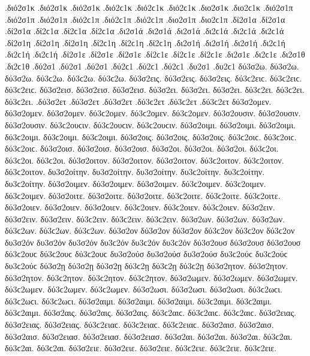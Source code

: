 {.διό2σ1κ .διό2σ1κ .διό2σ1κ .διό2ϲ1κ .διό2ϲ1κ .διό2ϲ1κ   %
.διο2σ1κ .διο2ϲ1κ 
.διό2σ1π .διό2σ1π .διό2σ1π .διό2ϲ1π .διό2ϲ1π .διό2ϲ1π   %
.διο2σ1π .διο2ϲ1π 
.δί2σ1α .δί2σ1α .δί2σ1α .δί2ϲ1α .δί2ϲ1α .δί2ϲ1α   %
.δι2σ1ά .δι2σ1ά .δι2σ1ά .δι2ϲ1ά .δι2ϲ1ά .δι2ϲ1ά 
.δί2σ1η .δί2σ1η .δί2σ1η .δί2ϲ1η .δί2ϲ1η .δί2ϲ1η   %
.δι2σ1ή .δι2σ1ή .δι2σ1ή .δι2ϲ1ή .δι2ϲ1ή .δι2ϲ1ή 
.δί2σ1ε .δί2σ1ε .δί2σ1ε .δί2ϲ1ε .δί2ϲ1ε .δί2ϲ1ε   %
.δι2σ1ε .δι2ϲ1ε 
.δι2σ1θ .δι2ϲ1θ   %
.δύ2σ1 .δύ2σ1 .δύ2σ1 .δύ2ϲ1 .δύ2ϲ1 .δύ2ϲ1   %
.δυ2σ1 .δυ2ϲ1 
%
δύ3σ2ω. δύ3σ2ω. δύ3σ2ω. δύ3ϲ2ω. δύ3ϲ2ω. δύ3ϲ2ω.   %
δύ3σ2εις. δύ3σ2εις. δύ3σ2εις. δύ3ϲ2ειϲ. δύ3ϲ2ειϲ. δύ3ϲ2ειϲ. 
δύ3σ2εισ. δύ3σ2εισ. δύ3σ2εισ. 
δύ3σ2ει. δύ3σ2ει. δύ3σ2ει. δύ3ϲ2ει. δύ3ϲ2ει. δύ3ϲ2ει. 
.δύ3σ2ετ .δύ3σ2ετ .δύ3σ2ετ .δύ3ϲ2ετ .δύ3ϲ2ετ .δύ3ϲ2ετ 
δύ3σ2ομεν. δύ3σ2ομεν. δύ3σ2ομεν. δύ3ϲ2ομεν. δύ3ϲ2ομεν. δύ3ϲ2ομεν. 
δύ3σ2ουσιν. δύ3σ2ουσιν. δύ3σ2ουσιν. δύ3ϲ2ουϲιν. δύ3ϲ2ουϲιν. δύ3ϲ2ουϲιν. 
δύ3σ2οιμι. δύ3σ2οιμι. δύ3σ2οιμι. δύ3ϲ2οιμι. δύ3ϲ2οιμι. δύ3ϲ2οιμι. 
δύ3σ2οις. δύ3σ2οις. δύ3σ2οις. δύ3ϲ2οιϲ. δύ3ϲ2οιϲ. δύ3ϲ2οιϲ. 
δύ3σ2οισ. δύ3σ2οισ. δύ3σ2οισ. 
δύ3σ2οι. δύ3σ2οι. δύ3σ2οι. δύ3ϲ2οι. δύ3ϲ2οι. δύ3ϲ2οι. 
δύ3σ2οιτον. δύ3σ2οιτον. δύ3σ2οιτον. δύ3ϲ2οιτον. δύ3ϲ2οιτον. δύ3ϲ2οιτον. 
δυ3σ2οίτην. δυ3σ2οίτην. δυ3σ2οίτην. δυ3ϲ2οίτην. δυ3ϲ2οίτην. δυ3ϲ2οίτην. 
δύ3σ2οιμεν. δύ3σ2οιμεν. δύ3σ2οιμεν. δύ3ϲ2οιμεν. δύ3ϲ2οιμεν. δύ3ϲ2οιμεν. 
δύ3σ2οιτε. δύ3σ2οιτε. δύ3σ2οιτε. δύ3ϲ2οιτε. δύ3ϲ2οιτε. δύ3ϲ2οιτε. 
δύ3σ2οιεν. δύ3σ2οιεν. δύ3σ2οιεν. δύ3ϲ2οιεν. δύ3ϲ2οιεν. δύ3ϲ2οιεν. 
δύ3σ2ειν. δύ3σ2ειν. δύ3σ2ειν. δύ3ϲ2ειν. δύ3ϲ2ειν. δύ3ϲ2ειν. 
δύ3σ2ων. δύ3σ2ων. δύ3σ2ων. δύ3ϲ2ων. δύ3ϲ2ων. δύ3ϲ2ων. δύ3σ2ον δύ3σ2ον δύ3σ2ον δύ3ϲ2ον δύ3ϲ2ον δύ3ϲ2ον δυ3σ2όν δυ3σ2όν δυ3σ2όν δυ3ϲ2όν δυ3ϲ2όν δυ3ϲ2όν 
δύ3σ2ουσ δύ3σ2ουσ δύ3σ2ουσ δύ3ϲ2ουϲ δύ3ϲ2ουϲ δύ3ϲ2ουϲ δυ3σ2ούσ δυ3σ2ούσ δυ3σ2ούσ δυ3ϲ2ούϲ δυ3ϲ2ούϲ δυ3ϲ2ούϲ 
δύ3σ2ῃ δύ3σ2ῃ δύ3σ2ῃ δύ3ϲ2ῃ δύ3ϲ2ῃ δύ3ϲ2ῃ 
δύ3σ2ητον. δύ3σ2ητον. δύ3σ2ητον. δύ3ϲ2ητον. δύ3ϲ2ητον. δύ3ϲ2ητον. 
δύ3σ2ωμεν. δύ3σ2ωμεν. δύ3σ2ωμεν. δύ3ϲ2ωμεν. δύ3ϲ2ωμεν. δύ3ϲ2ωμεν. 
δύ3σ2ωσι. δύ3σ2ωσι. δύ3σ2ωσι. δύ3ϲ2ωϲι. δύ3ϲ2ωϲι. δύ3ϲ2ωϲι. 
δύ3σ2αιμι. δύ3σ2αιμι. δύ3σ2αιμι. δύ3ϲ2αιμι. δύ3ϲ2αιμι. δύ3ϲ2αιμι. 
δύ3σ2αις. δύ3σ2αις. δύ3σ2αις. δύ3ϲ2αιϲ. δύ3ϲ2αιϲ. δύ3ϲ2αιϲ. δύ3σ2ειας. δύ3σ2ειας. δύ3σ2ειας. δύ3ϲ2ειαϲ. δύ3ϲ2ειαϲ. δύ3ϲ2ειαϲ. 
δύ3σ2αισ. δύ3σ2αισ. δύ3σ2αισ. δύ3σ2ειασ. δύ3σ2ειασ. δύ3σ2ειασ. 
δύ3σ2αι. δύ3σ2αι. δύ3σ2αι. δύ3ϲ2αι. δύ3ϲ2αι. δύ3ϲ2αι. δύ3σ2ειε. δύ3σ2ειε. δύ3σ2ειε. δύ3ϲ2ειε. δύ3ϲ2ειε. δύ3ϲ2ειε. 
}
